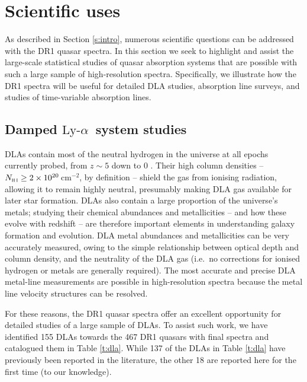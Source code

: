 \documentclass[fleqn,usenatbib,usedcolumn]{mnras}
\newcommand{\Sref}[1]{Section \ref{#1}}
\newcommand{\Tref}[1]{Table \ref{#1}}
\newcommand{\pcmsq}{\ensuremath{\textrm{cm}^{-2}}}
\newcommand{\lya}{\ensuremath{\textrm{Ly-}\alpha}}
\newcommand{\NHI}{\ensuremath{N_\textsc{h\scriptsize{\,i}}}}
\begin{document}
\section{Scientific uses}\label{s:use}

As described in \Sref{s:intro}, numerous scientific questions can be addressed with the DR1 quasar spectra. In this section we seek to highlight and assist the large-scale statistical studies of quasar absorption systems that are possible with such a large sample of high-resolution spectra. Specifically, we illustrate how the DR1 spectra will be useful for detailed DLA studies, absorption line surveys, and studies of time-variable absorption lines.


\subsection{Damped \lya\ system studies}\label{ss:dlas}

DLAs contain most of the neutral hydrogen in the universe at all epochs currently probed, from $z\sim5$ down to 0 \citep[see review by][]{Wolfe:2005:861}. Their high  column densities -- $\NHI\ge2\times10^{20}$\,\pcmsq, by definition -- shield the gas from ionising radiation, allowing it to remain highly neutral, presumably making DLA gas available for later star formation. DLAs also contain a large proportion of the universe's metals; studying their chemical abundances and metallicities -- and how these evolve with redshift -- are therefore important elements in understanding galaxy formation and evolution. DLA metal abundances and metallicities can be very accurately measured, owing to the simple relationship between optical depth and column density, and the neutrality of the DLA gas (i.e.\ no corrections for ionised hydrogen or metals are generally required). The most accurate and precise DLA metal-line measurements are possible in high-resolution spectra because the metal line velocity structures can be resolved.

For these reasons, the DR1 quasar spectra offer an excellent opportunity for detailed studies of a large sample of DLAs. To assist such work, we have identified 155 DLAs towards the 467 DR1 quasars with final spectra and catalogued them in \Tref{t:dla}. While 137 of the DLAs in \Tref{t:dla} have previously been reported in the literature, the other 18 are reported here for the first time (to our knowledge).

\setlength{\tabcolsep}{0.29em}

\setlength{\tabcolsep}{\oldtabcolsep}
\end{document}
